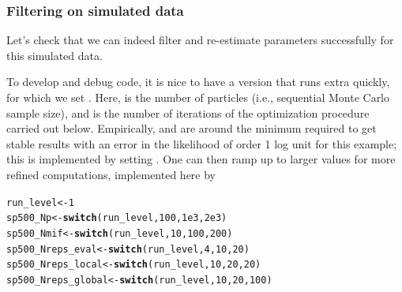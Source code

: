 \documentclass{beamer}\usepackage[]{graphicx}\usepackage[]{color}
\makeatletter
\newcommand{\hlnum}[1]{\textcolor[rgb]{0.686,0.059,0.569}{#1}}%
\newcommand{\hlstd}[1]{\textcolor[rgb]{0.345,0.345,0.345}{#1}}%
\newcommand{\hlkwb}[1]{\textcolor[rgb]{0.69,0.353,0.396}{#1}}%
\newcommand{\hlkwd}[1]{\textcolor[rgb]{0.737,0.353,0.396}{\textbf{#1}}}%
\newenvironment{kframe}{%
 \def\at@end@of@kframe{}%
 \ifinner\ifhmode%
  \def\at@end@of@kframe{\end{minipage}}%
  \begin{minipage}{\columnwidth}%
 \fi\fi%
 \def\FrameCommand##1{\hskip\@totalleftmargin \hskip-\fboxsep
 \colorbox{shadecolor}{##1}\hskip-\fboxsep
     \hskip-\linewidth \hskip-\@totalleftmargin \hskip\columnwidth}%
 \MakeFramed {\advance\hsize-\width
   \@totalleftmargin\z@ \linewidth\hsize
   \@setminipage}}%
 {\par\unskip\endMakeFramed%
 \at@end@of@kframe}
\newenvironment{knitrout}{}{} %
\makeatother
\begin{document}
\begin{frame}[fragile]

\frametitle{Filtering on simulated data}

\bi

\item Let's check that we can indeed filter and re-estimate parameters successfully for this simulated data.  

\item To develop and debug code, it is nice to have a version that runs extra quickly, for which we set . Here,  is the number of particles (i.e., sequential Monte Carlo sample size), and  is the number of iterations of the optimization procedure carried out below. Empirically,  and  are around the minimum required to get stable results with an error in the likelihood of order 1 log unit for this example; this is implemented by setting . One can then ramp up to larger values for more refined computations, implemented here by 

\ei

\begin{knitrout}\small
{}\color{fgcolor}\begin{kframe}
\begin{alltt}
\hlstd{run_level} \hlkwb{<-} \hlnum{1}
\hlstd{sp500_Np} \hlkwb{<-}           \hlkwd{switch}\hlstd{(run_level,}\hlnum{100}\hlstd{,}\hlnum{1e3}\hlstd{,}\hlnum{2e3}\hlstd{)}
\hlstd{sp500_Nmif} \hlkwb{<-}         \hlkwd{switch}\hlstd{(run_level,}\hlnum{10}\hlstd{,} \hlnum{100}\hlstd{,}\hlnum{200}\hlstd{)}
\hlstd{sp500_Nreps_eval} \hlkwb{<-}   \hlkwd{switch}\hlstd{(run_level,}\hlnum{4}\hlstd{,}  \hlnum{10}\hlstd{,}  \hlnum{20}\hlstd{)}
\hlstd{sp500_Nreps_local} \hlkwb{<-}  \hlkwd{switch}\hlstd{(run_level,}\hlnum{10}\hlstd{,} \hlnum{20}\hlstd{,} \hlnum{20}\hlstd{)}
\hlstd{sp500_Nreps_global} \hlkwb{<-} \hlkwd{switch}\hlstd{(run_level,}\hlnum{10}\hlstd{,} \hlnum{20}\hlstd{,} \hlnum{100}\hlstd{)}
\end{alltt}
\end{kframe}
\end{knitrout}

\end{frame}
\end{document}
